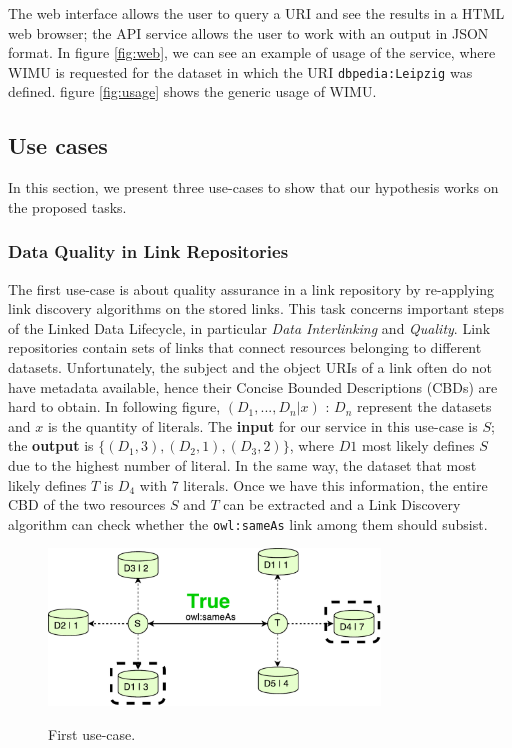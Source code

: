 The web interface allows the user to query a URI and see the results in a HTML web browser; the API service allows the user to work with an output in JSON format. %
In figure \ref{fig:web}, we can see an example of usage of the service, where WIMU is requested for the dataset in which the URI \texttt{dbpedia:Leipzig} was defined.
figure \ref{fig:usage} shows the generic usage of WIMU.


\subsection{Use cases}

In this section, we present three use-cases to show that our hypothesis works on the proposed tasks.

\subsubsection{Data Quality in Link Repositories}

The first use-case is about quality assurance in a link repository by re-applying link discovery algorithms on the stored links.
This task concerns important steps of the Linked Data Lifecycle, in particular \textit{Data Interlinking} and \textit{Quality}.
Link repositories contain sets of links that connect resources belonging to different datasets. 
Unfortunately, the subject and the object URIs of a link often do not have metadata available, hence their Concise Bounded Descriptions (CBDs) are hard to obtain.
In following figure, $(D_1,...,D_n|x)$ : $D_n$ represent the datasets and $x$ is the quantity of literals. 
The \textbf{input} for our service in this use-case is $S$; the \textbf{output} is $\{(D_1,3),(D_2,1),(D_3,2)\}$, where $D1$ most likely defines $S$ due to the highest number of literal. 
In the same way, the dataset that most likely defines $T$ is $D_4$ with 7 literals. 
Once we have this information, the entire CBD of the two resources $S$ and $T$ can be extracted and a Link Discovery algorithm can check whether the \texttt{owl:sameAs} link among them should subsist.


\begin{figure}[htb] 
	\centering
	\includegraphics[width=250pt]{img/true.pdf}
	\label{fig:caseTrue}
	\caption{First use-case.}
\end{figure}

